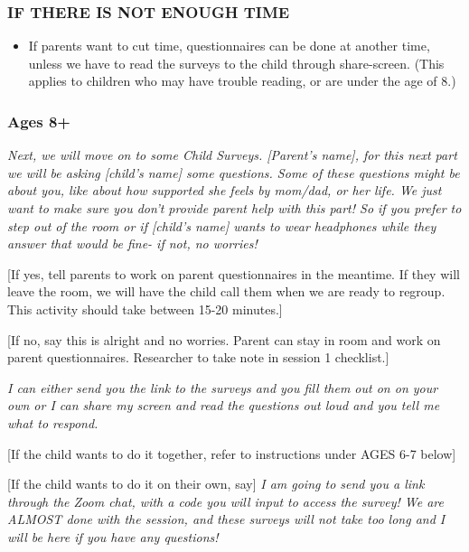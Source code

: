 \documentclass[]{book}
\providecommand{\tightlist}{%
  \setlength{\itemsep}{0pt}\setlength{\parskip}{0pt}}
\begin{document}
\hypertarget{if-there-is-not-enough-time-2}{%
\subsubsection{IF THERE IS NOT ENOUGH TIME}\label{if-there-is-not-enough-time-2}}

\begin{itemize}
\tightlist
\item
  If parents want to cut time, questionnaires can be done at another time, unless we have to read the surveys to the child through share-screen. (This applies to children who may have trouble reading, or are under the age of 8.)
\end{itemize}

\hypertarget{ages-8-2}{%
\subsubsection{Ages 8+}\label{ages-8-2}}

\emph{Next, we will move on to some Child Surveys. {[}Parent's name{]}, for this next part we will be asking {[}child's name{]} some questions. Some of these questions might be about you, like about how supported she feels by mom/dad, or her life. We just want to make sure you don't provide parent help with this part! So if you prefer to step out of the room or if {[}child's name{]} wants to wear headphones while they answer that would be fine- if not, no worries!}

{[}If yes, tell parents to work on parent questionnaires in the meantime. If they will leave the room, we will have the child call them when we are ready to regroup. This activity should take between 15-20 minutes.{]}

{[}If no, say this is alright and no worries. Parent can stay in room and work on parent questionnaires. Researcher to take note in session 1 checklist.{]}

\emph{I can either send you the link to the surveys and you fill them out on on your own or I can share my screen and read the questions out loud and you tell me what to respond.}

{[}If the child wants to do it together, refer to instructions under AGES 6-7 below{]}

{[}If the child wants to do it on their own, say{]} \emph{I am going to send you a link through the Zoom chat, with a code you will input to access the survey! We are ALMOST done with the session, and these surveys will not take too long and I will be here if you have any questions! }
\end{document}
